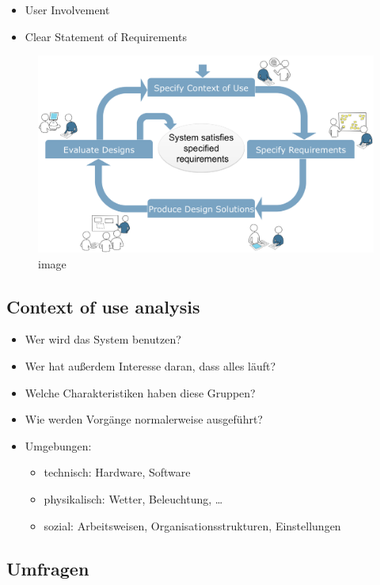 \begin{itemize}
\item
  User Involvement
\item
  Clear Statement of Requirements
\end{itemize}

\begin{figure}[htbp]
\centering
\includegraphics{inc/HCDP.pdf}
\caption{image}
\end{figure}

\subsection{Context of use analysis}

\begin{itemize}
\item
  Wer wird das System benutzen?
\item
  Wer hat außerdem Interesse daran, dass alles läuft?
\item
  Welche Charakteristiken haben diese Gruppen?
\item
  Wie werden Vorgänge normalerweise ausgeführt?
\item
  Umgebungen:

  \begin{itemize}
  \item
    technisch: Hardware, Software
  \item
    physikalisch: Wetter, Beleuchtung, \ldots{}
  \item
    sozial: Arbeitsweisen, Organisationsstrukturen, Einstellungen
  \end{itemize}
\end{itemize}

\subsection{Umfragen}

